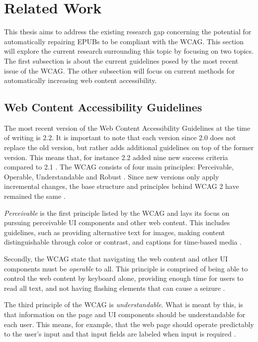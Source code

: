 \section{Related Work}
\label{sec:related_work}
This thesis aims to address the existing research gap concerning the potential for automatically repairing EPUBs to be compliant with the WCAG. This section will explore the current research surrounding this topic by focusing on two topics. The first subsection is about the current guidelines posed by the most recent issue of the WCAG. The other subsection will focus on current methods for automatically increasing web content accessibility.

\subsection{Web Content Accessibility Guidelines}
The most recent version of the Web Content Accessibility Guidelines at the time of writing is 2.2. It is important to note that each version since 2.0 does not replace the old version, but rather adds additional guidelines on top of the former version. This means that, for instance 2.2 added nine new success criteria compared to 2.1 \cite{WCAGGuidelines}. The WCAG consists of four main principles: Perceivable, Operable, Understandable and Robust \cite{Caldwell2008}. Since new versions only apply incremental changes, the base structure and principles behind WCAG 2 have remained the same \cite{WCAGGuidelines}.

\textit{Perceivable} is the first principle listed by the WCAG and lays its focus on pursuing perceivable UI components and other web content. This includes guidelines, such as providing alternative text for images, making content distinguishable through color or contrast, and captions for time-based media \cite{Caldwell2008}.

Secondly, the WCAG state that navigating the web content and other UI components must be \textit{operable} to all. This principle is comprised of being able to control the web content by keyboard alone, providing enough time for users to read all text, and not having flashing elements that can cause a seizure \cite{Caldwell2008}.

The third principle of the WCAG is \textit{understandable}. What is meant by this, is that information on the page and UI components should be understandable for each user. This means, for example, that the web page should operate predictably to the user's input and that input fields are labeled when input is required \cite{Caldwell2008}.

